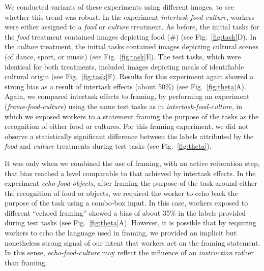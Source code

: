 \documentclass[12pt]{article}
\begin{document}
We conducted variants of these experiments using different images, to see 
whether this trend was robust.  In the experiment 
\textit{intertask-food-culture},
workers were either assigned to a \textit{food} or \textit{culture} treatment.
As before, the initial tasks for the \textit{food} treatment contained images 
depicting food (\#) (see Fig.~\ref{fig:task}D). 
In the \textit{culture} treatment, 
the initial tasks contained images depicting cultural scenes 
(of dance, sport, or music) (see Fig.~\ref{fig:task}E).  The test tasks, which were identical for both
treatments, included images depicting meals of identifiable cultural 
origin 
(see Fig.~\ref{fig:task}F).  Results for this experiment again showed a 
strong bias as a result of intertask effects (about 50\%) 
(see Fig.~\ref{fig:theta}A).  Again, we compared intertask effects to 
framing, by performing an experiment (\textit{frame-food-culture}) using 
the same test tasks as in \textit{intertask-food-culture}, in which we exposed
workers to a statement framing the purpose of the tasks as the recognition 
of either food or cultures.  
For this framing experiment, we did not observe a statistically significant 
difference between the labels attributed by the \textit{food} and 
\textit{culture} treatments during test tasks (see Fig.~\ref{fig:theta}).

It was only when we combined the use of framing, with an active 
reiteration step, that bias reached a level comparable to that achieved 
by intertask effects.  In the experiment \textit{echo-food-objects},
after framing the purpose of the task around either the recognition of food
or objects, we required the worker to echo back the purpose of the task
using a combo-box input.  In this case, workers exposed to different 
``echoed framing'' showed a bias of about 35\% in the labels provided during 
test tasks
(see Fig.~\ref{fig:theta}A). However, it is possible that by requiring 
workers to echo the language used in framing, we provided an implicit 
but nonetheless strong signal of our intent that workers act on the 
framing statement.  In this sense, \textit{echo-food-culture} may reflect the 
influence of an \textit{instruction} rather than framing.
\end{document}
